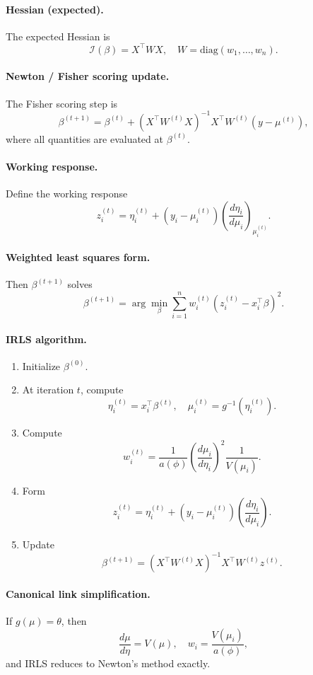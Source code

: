 \documentclass[11pt]{article}
\theoremstyle{definition}
\begin{document}
\paragraph{Hessian (expected).}
The expected Hessian is
\[
\mathcal{I}(\beta)
=
X^\top W X,
\quad
W = \mathrm{diag}(w_1,\dots,w_n).
\]
\paragraph{Newton / Fisher scoring update.}
The Fisher scoring step is
\[
\beta^{(t+1)}
=
\beta^{(t)}
+
\left(X^\top W^{(t)} X\right)^{-1}
X^\top W^{(t)} (y - \mu^{(t)}),
\]
where all quantities are evaluated at $\beta^{(t)}$.

\paragraph{Working response.}
Define the working response
\[
z_i^{(t)}
=
\eta_i^{(t)}
+
(y_i - \mu_i^{(t)})
\left(\frac{d\eta_i}{d\mu_i}\right)_{\mu_i^{(t)}}.
\]

\paragraph{Weighted least squares form.}
Then $\beta^{(t+1)}$ solves
\[
\beta^{(t+1)}
=
\arg\min_{\beta}
\sum_{i=1}^n
w_i^{(t)}
\left(z_i^{(t)} - x_i^\top \beta\right)^2.
\]

\paragraph{IRLS algorithm.}
\begin{enumerate}
  \item Initialize $\beta^{(0)}$.
  \item At iteration $t$, compute
  \[
  \eta_i^{(t)} = x_i^\top \beta^{(t)}, \quad
  \mu_i^{(t)} = g^{-1}(\eta_i^{(t)}).
  \]
  \item Compute
  \[
  w_i^{(t)}
  =
  \frac{1}{a(\phi)}
  \left(\frac{d\mu_i}{d\eta_i}\right)^2
  \frac{1}{V(\mu_i)}.
  \]
  \item Form
  \[
  z_i^{(t)}
  =
  \eta_i^{(t)}
  +
  (y_i - \mu_i^{(t)})
  \left(\frac{d\eta_i}{d\mu_i}\right).
  \]
  \item Update
  \[
  \beta^{(t+1)}
  =
  \left(X^\top W^{(t)} X\right)^{-1}
  X^\top W^{(t)} z^{(t)}.
  \]
\end{enumerate}

\paragraph{Canonical link simplification.}
If $g(\mu)=\theta$, then
\[
\frac{d\mu}{d\eta} = V(\mu),
\quad
w_i = \frac{V(\mu_i)}{a(\phi)},
\]
and IRLS reduces to Newton's method exactly.
\end{document}
